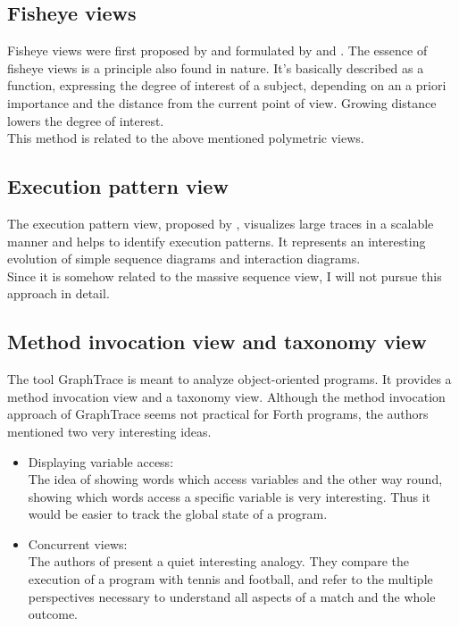 \subsection*{Fisheye views}
Fisheye views were first proposed by \cite{Furnas:1986:GFV:22627.22342} and formulated by \cite{Storey:1995:GLA:647547.728600} and \cite{Sarkar:1994:GFV:198366.198384}. The essence of fisheye views is a principle also found in nature. It's basically described as a function, expressing the degree of interest of a subject, depending on an a priori importance and the distance from the current point of view. Growing distance lowers the degree of interest.
\\
This method is related to the above mentioned polymetric views.

\subsection*{Execution pattern view}
The execution pattern view, proposed by \cite{Pauw98executionpatterns}, visualizes large traces in a scalable manner and helps to identify execution patterns. It represents an interesting evolution of simple sequence diagrams and interaction diagrams.
\\
Since it is somehow related to the massive sequence view, I will not pursue this approach in detail.

\subsection*{Method invocation view and taxonomy view}
The tool \gls{GraphTrace}\cite{Kleyn:1988:GOS:62084.62101} is meant to analyze object-oriented programs. It provides a method invocation view and a taxonomy view. Although the method invocation approach of GraphTrace seems not practical for Forth programs, the authors mentioned two very interesting ideas.
\begin{itemize}
\item Displaying variable access:\\
	The idea of showing words which access variables and the other way round, showing which words access a specific variable is very interesting. Thus it would be easier to track the global state of a program.
\item Concurrent views:\\
	The authors of \cite{Kleyn:1988:GOS:62084.62101} present a quiet interesting analogy. They compare the execution of a program with tennis and football, and refer to the multiple perspectives necessary to understand all aspects of a match and the whole outcome.
\end{itemize}

